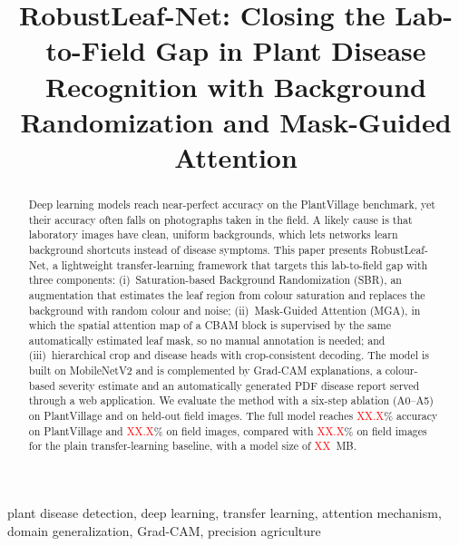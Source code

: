 \documentclass[conference]{IEEEtran}
\newcommand{\tbd}[1]{\textcolor{red}{#1}}
\newcommand{\AccIn}{\tbd{XX.X}}\newcommand{\AccField}{\tbd{XX.X}}
\newcommand{\AccFieldBase}{\tbd{XX.X}}\newcommand{\SizeMB}{\tbd{XX}}
\begin{document}
\title{RobustLeaf-Net: Closing the Lab-to-Field Gap in Plant Disease Recognition with Background Randomization and Mask-Guided Attention}

\author{
}

\maketitle

\begin{abstract}
Deep learning models reach near-perfect accuracy on the PlantVillage benchmark, yet their accuracy often falls on photographs taken in the field. A likely cause is that laboratory images have clean, uniform backgrounds, which lets networks learn background shortcuts instead of disease symptoms. This paper presents RobustLeaf-Net, a lightweight transfer-learning framework that targets this lab-to-field gap with three components: (i)~Saturation-based Background Randomization (SBR), an augmentation that estimates the leaf region from colour saturation and replaces the background with random colour and noise; (ii)~Mask-Guided Attention (MGA), in which the spatial attention map of a CBAM block is supervised by the same automatically estimated leaf mask, so no manual annotation is needed; and (iii)~hierarchical crop and disease heads with crop-consistent decoding. The model is built on MobileNetV2 and is complemented by Grad-CAM explanations, a colour-based severity estimate and an automatically generated PDF disease report served through a web application. We evaluate the method with a six-step ablation (A0--A5) on PlantVillage and on held-out field images. The full model reaches \AccIn\% accuracy on PlantVillage and \AccField\% on field images, compared with \AccFieldBase\% on field images for the plain transfer-learning baseline, with a model size of \SizeMB~MB.
\end{abstract}

\begin{IEEEkeywords}
plant disease detection, deep learning, transfer learning, attention mechanism, domain generalization, Grad-CAM, precision agriculture
\end{IEEEkeywords}
\end{document}
